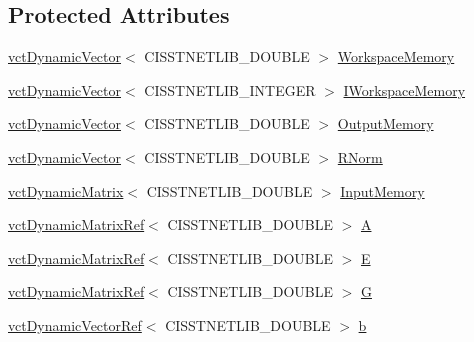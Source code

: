 \subsection*{Protected Attributes}
\begin{DoxyCompactItemize}
\item 
\hyperlink{classvct_dynamic_vector}{vct\+Dynamic\+Vector}$<$ C\+I\+S\+S\+T\+N\+E\+T\+L\+I\+B\+\_\+\+D\+O\+U\+B\+L\+E $>$ \hyperlink{classnmr_l_sq_lin_solution_dynamic_afa790c8ff0361dfe31522d1287cc03c2}{Workspace\+Memory}
\item 
\hyperlink{classvct_dynamic_vector}{vct\+Dynamic\+Vector}$<$ C\+I\+S\+S\+T\+N\+E\+T\+L\+I\+B\+\_\+\+I\+N\+T\+E\+G\+E\+R $>$ \hyperlink{classnmr_l_sq_lin_solution_dynamic_a5d42d35b6d178d1cdfc61c15af11a512}{I\+Workspace\+Memory}
\item 
\hyperlink{classvct_dynamic_vector}{vct\+Dynamic\+Vector}$<$ C\+I\+S\+S\+T\+N\+E\+T\+L\+I\+B\+\_\+\+D\+O\+U\+B\+L\+E $>$ \hyperlink{classnmr_l_sq_lin_solution_dynamic_a1a8dc3a952ff9e7ea4bd94d9ec9c41bf}{Output\+Memory}
\item 
\hyperlink{classvct_dynamic_vector}{vct\+Dynamic\+Vector}$<$ C\+I\+S\+S\+T\+N\+E\+T\+L\+I\+B\+\_\+\+D\+O\+U\+B\+L\+E $>$ \hyperlink{classnmr_l_sq_lin_solution_dynamic_a59172e2f2811910c7ac6c83509ecf504}{R\+Norm}
\item 
\hyperlink{classvct_dynamic_matrix}{vct\+Dynamic\+Matrix}$<$ C\+I\+S\+S\+T\+N\+E\+T\+L\+I\+B\+\_\+\+D\+O\+U\+B\+L\+E $>$ \hyperlink{classnmr_l_sq_lin_solution_dynamic_abcfb3ce4549a3ac8926ca94a071fa61f}{Input\+Memory}
\item 
\hyperlink{classvct_dynamic_matrix_ref}{vct\+Dynamic\+Matrix\+Ref}$<$ C\+I\+S\+S\+T\+N\+E\+T\+L\+I\+B\+\_\+\+D\+O\+U\+B\+L\+E $>$ \hyperlink{classnmr_l_sq_lin_solution_dynamic_aa4a41abac141e2e55dd5cafb59169dfd}{A}
\item 
\hyperlink{classvct_dynamic_matrix_ref}{vct\+Dynamic\+Matrix\+Ref}$<$ C\+I\+S\+S\+T\+N\+E\+T\+L\+I\+B\+\_\+\+D\+O\+U\+B\+L\+E $>$ \hyperlink{classnmr_l_sq_lin_solution_dynamic_a7c1ac112b07f3edd33d348fe0a40fb71}{E}
\item 
\hyperlink{classvct_dynamic_matrix_ref}{vct\+Dynamic\+Matrix\+Ref}$<$ C\+I\+S\+S\+T\+N\+E\+T\+L\+I\+B\+\_\+\+D\+O\+U\+B\+L\+E $>$ \hyperlink{classnmr_l_sq_lin_solution_dynamic_a399cb314fb848d36f58c14830bad0c28}{G}
\item 
\hyperlink{classvct_dynamic_vector_ref}{vct\+Dynamic\+Vector\+Ref}$<$ C\+I\+S\+S\+T\+N\+E\+T\+L\+I\+B\+\_\+\+D\+O\+U\+B\+L\+E $>$ \hyperlink{classnmr_l_sq_lin_solution_dynamic_a38efbfac59be113b58fd8a23cf543e5f}{b}

\end{DoxyCompactItemize}
